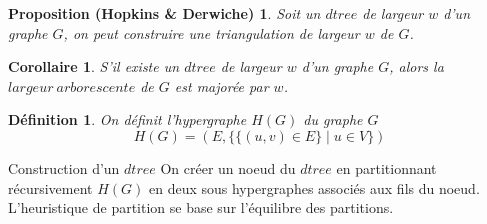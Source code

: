 \documentclass[handout]{beamer}
\begin{document}
\newtheorem*{mdef}{Définition}
\newtheorem*{cor}{Corollaire}

\begin{frame}
\newtheorem*{prop_hd}{Proposition (Hopkins \& Derwiche)}
\begin{prop_hd}
   Soit un $dtree$ de largeur $w$ d'un graphe $G$,
   on peut construire une triangulation de largeur $w$ de $G$.
\end{prop_hd}
\begin{cor}
  S'il existe un $dtree$ de largeur $w$ d'un graphe $G$,
  alors la $largeur\ arborescente$ de $G$ est majorée par $w$.
\end{cor}

\begin{mdef}
On définit l'hypergraphe $H(G)$ du graphe $G$
$$H(G) = (E,\{ \{ (u,v) \in E \} \mid u \in V \})$$
\end{mdef}

\begin{block}{Construction d'un $dtree$}
  On créer un noeud du $dtree$ en partitionnant récursivement $H(G)$
  en deux sous hypergraphes associés aux fils du noeud.\\
  L'heuristique de partition se base sur l'équilibre des partitions.
\end{block}

\end{frame}
\end{document}
